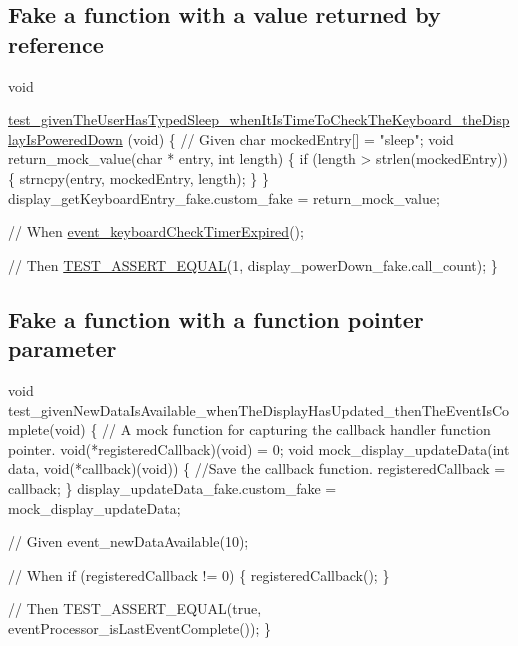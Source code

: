 \subsection*{Fake a function with a value returned by reference}


\begin{DoxyCode}
\textcolor{keywordtype}{void}

      \hyperlink{test__event__processor_8c_a534f0b7275d9d4a29985cacf3e8342aa}{test\_givenTheUserHasTypedSleep\_whenItIsTimeToCheckTheKeyboard\_theDisplayIsPoweredDown}
      (\textcolor{keywordtype}{void})
\{
    \textcolor{comment}{// Given}
    \textcolor{keywordtype}{char} mockedEntry[] = \textcolor{stringliteral}{"sleep"};
    \textcolor{keywordtype}{void} return\_mock\_value(\textcolor{keywordtype}{char} * entry, \textcolor{keywordtype}{int} length)
    \{
        \textcolor{keywordflow}{if} (length > strlen(mockedEntry))
        \{
            strncpy(entry, mockedEntry, length);
        \}
    \}
    display\_getKeyboardEntry\_fake.custom\_fake = return\_mock\_value;

    \textcolor{comment}{// When}
    \hyperlink{event__processor_8c_a215d1e5ccd386376a8f2f7ca5de2d6fa}{event\_keyboardCheckTimerExpired}();

    \textcolor{comment}{// Then}
    \hyperlink{unity_8h_af9e5695d6c7cf634206ea6d062cb54c9}{TEST\_ASSERT\_EQUAL}(1, display\_powerDown\_fake.call\_count);
\}
\end{DoxyCode}


\subsection*{Fake a function with a function pointer parameter}


\begin{DoxyCode}
void
test\_givenNewDataIsAvailable\_whenTheDisplayHasUpdated\_thenTheEventIsComplete(void)
\{
    // A mock function for capturing the callback handler function pointer.
    void(*registeredCallback)(void) = 0;
    void mock\_display\_updateData(int data, void(*callback)(void))
    \{
        //Save the callback function.
        registeredCallback = callback;
    \}
    display\_updateData\_fake.custom\_fake = mock\_display\_updateData;

    // Given
    event\_newDataAvailable(10);

    // When
    if (registeredCallback != 0)
    \{
        registeredCallback();
    \}

    // Then
    TEST\_ASSERT\_EQUAL(true, eventProcessor\_isLastEventComplete());
\}
\end{DoxyCode}


